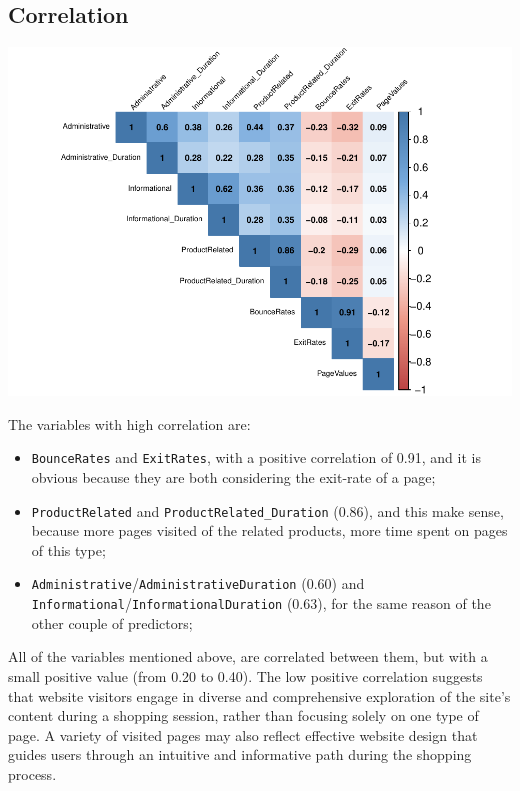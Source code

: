 \documentclass[
]{article}
\begin{document}
\subsection{Correlation}\label{correlation}

\includegraphics{report_official_files/figure-latex/unnamed-chunk-7-1.pdf}

The variables with high correlation are:

\begin{itemize}
\item
  \texttt{BounceRates} and \texttt{ExitRates}, with a positive
  correlation of 0.91, and it is obvious because they are both
  considering the exit-rate of a page;
\item
  \texttt{ProductRelated} and \texttt{ProductRelated\_Duration} (0.86),
  and this make sense, because more pages visited of the related
  products, more time spent on pages of this type;
\item
  \texttt{Administrative}/\texttt{AdministrativeDuration} (0.60) and
  \texttt{Informational}/\texttt{InformationalDuration} (0.63), for the
  same reason of the other couple of predictors;
\end{itemize}

All of the variables mentioned above, are correlated between them, but
with a small positive value (from 0.20 to 0.40). The low positive
correlation suggests that website visitors engage in diverse and
comprehensive exploration of the site's content during a shopping
session, rather than focusing solely on one type of page. A variety of
visited pages may also reflect effective website design that guides
users through an intuitive and informative path during the shopping
process.
\end{document}
